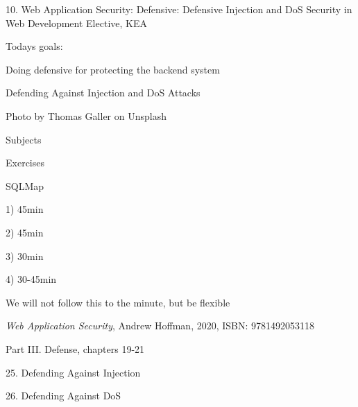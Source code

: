 \documentclass[Screen16to9,17pt]{foils}
\begin{document}
\mytitlepage
{10. Web Application Security: Defensive: Defensive Injection and DoS}
{Security in Web Development Elective, KEA}




Todays goals:
\begin{list2}
\item Doing defensive for protecting the backend system
\item Defending Against Injection and DoS Attacks
\end{list2}

Photo by Thomas Galler on Unsplash




\begin{list1}
\item Subjects
\begin{list2}
\item
\end{list2}
\item Exercises
\begin{list2}
\item SQLMap
\end{list2}
\end{list1}


\begin{list2}
\item 1) 45min
\item 2) 45min
\item 3) 30min
\item 4) 30-45min
\end{list2}

We will not follow this to the minute, but be flexible


\emph{Web Application Security}, Andrew Hoffman, 2020, ISBN: 9781492053118

\begin{list1}
\item Part III. Defense, chapters 19-21
\item 25. Defending Against Injection
\item 26. Defending Against DoS

\end{list1}
\end{document}
